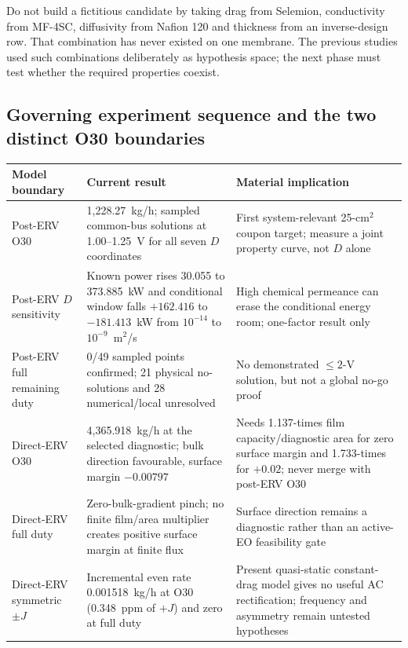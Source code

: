 \documentclass[10pt,a4paper]{article}
\begin{document}
\begin{stopbox}
Do not build a fictitious candidate by taking drag from Selemion, conductivity
from MF-4SC, diffusivity from Nafion 120 and thickness from an inverse-design
row. That combination has never existed on one membrane. The previous studies
used such combinations deliberately as hypothesis space; the next phase must
test whether the required properties coexist.
\end{stopbox}

\subsection{Governing experiment sequence and the two distinct O30 boundaries}

\begin{center}\footnotesize
\begin{tabularx}{\textwidth}{@{}p{31mm}p{42mm}Y@{}}
\toprule
\textbf{Model boundary} & \textbf{Current result} & \textbf{Material implication} \\
\midrule
Post-ERV O30 & 1,228.27~kg/h; sampled common-bus solutions at 1.00--1.25~V for all seven $D$ coordinates & First system-relevant 25-cm$^2$ coupon target; measure a joint property curve, not $D$ alone \\
Post-ERV $D$ sensitivity & Known power rises 30.055 to 373.885~kW and conditional window falls $+162.416$ to $-181.413$~kW from $10^{-14}$ to $10^{-9}$~m$^2$/s & High chemical permeance can erase the conditional energy room; one-factor result only \\
Post-ERV full remaining duty & 0/49 sampled points confirmed; 21 physical no-solutions and 28 numerical/local unresolved & No demonstrated $\leq2$-V solution, but not a global no-go proof \\
Direct-ERV O30 & 4,365.918~kg/h at the selected diagnostic; bulk direction favourable, surface margin $-0.00797$ & Needs 1.137-times film capacity/diagnostic area for zero surface margin and 1.733-times for $+0.02$; never merge with post-ERV O30 \\
Direct-ERV full duty & Zero-bulk-gradient pinch; no finite film/area multiplier creates positive surface margin at finite flux & Surface direction remains a diagnostic rather than an active-EO feasibility gate \\
Direct-ERV symmetric $\pm J$ & Incremental even rate 0.001518~kg/h at O30 (0.348~ppm of $+J$) and zero at full duty & Present quasi-static constant-drag model gives no useful AC rectification; frequency and asymmetry remain untested hypotheses \\

\end{tabularx}
\end{center}
\end{document}
